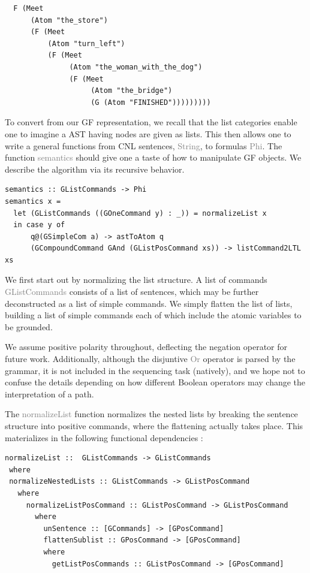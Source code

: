 \documentclass{article}
\newcommand{\gray}[1]{\textcolor{gray}{#1}}
\begin{document}
\begin{verbatim}
  F (Meet
      (Atom "the_store")
      (F (Meet
          (Atom "turn_left")
          (F (Meet
               (Atom "the_woman_with_the_dog")
               (F (Meet
                    (Atom "the_bridge")
                    (G (Atom "FINISHED")))))))))
\end{verbatim}

To convert from our GF representation, we recall that the list categories enable
one to imagine a AST having nodes are given as lists. This then allows one to
write a general functions from CNL sentences, \gray{String}, to formulas
\gray{Phi}. The function \gray{semantics} should give one a taste of how to
manipulate GF objects. We describe the algorithm via its recursive behavior.

\begin{verbatim}
semantics :: GListCommands -> Phi
semantics x =
  let (GListCommands ((GOneCommand y) : _)) = normalizeList x
  in case y of
      q@(GSimpleCom a) -> astToAtom q
      (GCompoundCommand GAnd (GListPosCommand xs)) -> listCommand2LTL xs
\end{verbatim}

We first start out by normalizing the list structure. A list of commands
\gray{GListCommands} consists of a list of sentences, which may be further
deconstructed as a list of simple commands. We simply flatten the list of lists,
building a list of simple commands each of which include the atomic variables to
be grounded.

We assume positive polarity throughout, deflecting the negation operator for
future work. Additionally, although the disjuntive \gray{Or} operator is parsed
by the grammar, it is not included in the sequencing task (natively), and we
hope not to confuse the details depending on how different Boolean operators may
change the interpretation of a path.

The \gray{normalizeList} function normalizes the nested lists by breaking the sentence
structure into positive commands, where the flattening actually takes place.
This materializes in the following functional dependencies :

\begin{verbatim}
normalizeList ::  GListCommands -> GListCommands
 where
 normalizeNestedLists :: GListCommands -> GListPosCommand
   where
     normalizeListPosCommand :: GListPosCommand -> GListPosCommand
       where
         unSentence :: [GCommands] -> [GPosCommand]
         flattenSublist :: GPosCommand -> [GPosCommand]
         where
           getListPosCommands :: GListPosCommand -> [GPosCommand]
\end{verbatim}
\end{document}
